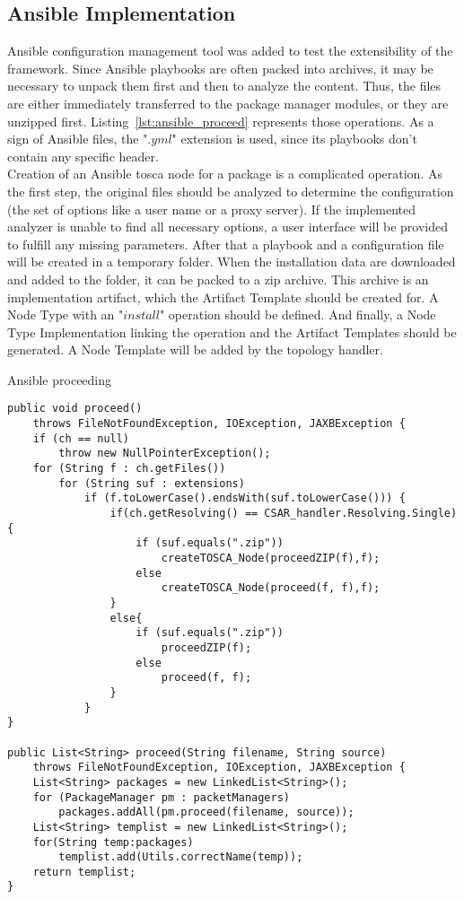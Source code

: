 \subsection*{Ansible Implementation}
Ansible configuration management tool was added to test the extensibility of the framework.
Since Ansible playbooks are often packed into archives, it may be necessary to unpack them first and then to analyze the content.
Thus, the files are either immediately transferred to the package manager modules, or they are unzipped first.
Listing~\ref{lst:ansible_proceed} represents those operations.
As a sign of Ansible files, the ".$yml$" extension is used, since its playbooks don't contain any specific header.\\
Creation of an Ansible \gls{tosca} node for a package is a complicated operation. 
As the first step, the original files should be analyzed to determine the configuration (the set of options like a user name or a proxy server).
If the implemented analyzer is unable to find all necessary options, a user interface will be provided to fulfill any missing parameters.
After that a playbook and a configuration file will be created in a temporary folder.
When the installation data are downloaded and added to the folder, it can be packed to a zip archive.
This archive is an implementation artifact, which the Artifact Template should be created for.
A Node Type with an "$install$" operation %
should be defined.
And finally, a Node Type Implementation linking the operation and the Artifact Templates should be generated.
A Node Template will be added by the topology handler.
\begin{Listing}
	\caption{Ansible proceeding}
	\label{lst:ansible_proceed}
\begin{lstlisting}
public void proceed()
	throws FileNotFoundException, IOException, JAXBException {
	if (ch == null)
		throw new NullPointerException();
	for (String f : ch.getFiles())
		for (String suf : extensions)
			if (f.toLowerCase().endsWith(suf.toLowerCase())) {
				if(ch.getResolving() == CSAR_handler.Resolving.Single){
					if (suf.equals(".zip")) 
						createTOSCA_Node(proceedZIP(f),f);
					else
						createTOSCA_Node(proceed(f, f),f);
				}
				else{
					if (suf.equals(".zip")) 
						proceedZIP(f);
					else
						proceed(f, f);
				}
			}
}
	
public List<String> proceed(String filename, String source)
	throws FileNotFoundException, IOException, JAXBException {
	List<String> packages = new LinkedList<String>();
	for (PackageManager pm : packetManagers)
		packages.addAll(pm.proceed(filename, source));
	List<String> templist = new LinkedList<String>();
	for(String temp:packages)
		templist.add(Utils.correctName(temp));
	return templist;
}
\end{lstlisting}
\end{Listing}
